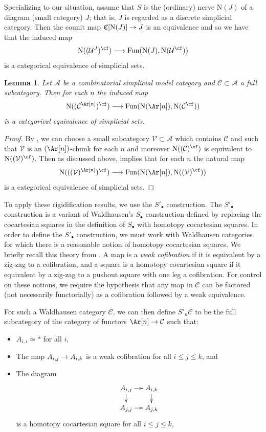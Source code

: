 \documentclass{amsart}
\newcommand{\ssdot}{\bullet}%
\newcommand{\Spdot}[1][\ssdot]{S'_{#1}}
\newcommand{\Sdot}[1][\ssdot]{S_{#1}}
\newcommand{\htp}{\simeq}
\renewcommand{\to}{\mathchoice{\longrightarrow}{\rightarrow}{\rightarrow}{\rightarrow}}
\let\catsymbfont\mathcal
\newcommand{\aA}{{\catsymbfont{A}}}
\newcommand{\aC}{{\catsymbfont{C}}}
\newcommand{\aU}{{\catsymbfont{U}}}
\newcommand{\aV}{{\catsymbfont{V}}}
\newcommand{\A}{\mathcal{A}}
\newcommand{\N}{\mathrm{N}}
\newcommand{\Fun}{\mathrm{Fun}} %
\numberwithin{equation}{section}
\newtheorem{lemma}[equation]{Lemma}
\theoremstyle{definition}
\begin{document}
Specializing to our situation, assume that $S$ is the (ordinary) nerve
$\N(J)$ of a diagram (small category) $J$; that is, $J$ is regarded as
a discrete simplicial category.  Then the counit map
$\mathfrak{C}[\N(J)] \to J$ is an equivalence and so we have that the
induced map
\[
\N((\aU^J)^{\cf}) \to \Fun(\N(J), \N(\aU^{\cf}))
\]
is a categorical equivalence of simplicial sets.

\begin{lemma}\label{lem:diagcomp}
Let $\aA$ be a combinatorial simplicial model category and $\aC
\subset \aA$ a full subcategory.  Then for each $n$ the induced map
\[
\N((\aC^{\Ar[n]})^{\cf}) \to \Fun(\N(\Ar[n]), \N(\aC^{\cf}))
\]
is a categorical equivalence of simplicial sets.
\end{lemma}

\begin{proof}
By \cite[A.3.4.15]{HTT}, we can choose a small subcategory $\aV
\subset \aA$ which contains $\aC$ and such that $\aV$ is an
$(\Ar[n])$-chunk for each $n$ and moreover $\N((\aC)^{\cf})$ is
equivalent to $\N((\aV)^{\cf})$.  Then as discussed above,
\cite[4.2.4.4]{HTT} implies that for each $n$ the natural map
\[
\N(((\aV)^{\Ar[n]})^{\cf}) \to \Fun(\N(\Ar[n]),
\N((\aV)^{\cf}))
\]
is a categorical equivalence of simplicial sets.
\end{proof}

To apply these rigidification results, we use the $\Spdot$
construction.  The $\Spdot$ construction \cite[2.7]{BM3} is a variant
of Waldhausen's $\Sdot$ construction defined by replacing the cocartesian
squares in the definition of $\Sdot$ with homotopy cocartesian
squares.  In order to define the $\Spdot$ construction, we must work
with Waldhausen categories for which there is a reasonable notion of
homotopy cocartesian squares.  We briefly recall this theory
from \cite[\S 2]{BM3}.  A map is a {\em weak cofibration} if it is
equivalent by a zig-zag to a cofibration, and a square is a homotopy
cocartesian square if it equivalent by a zig-zag to a pushout square
with one leg a cofibration.  For control on these notions, we require
the hypothesis that any map in $\aC$ can be factored (not necessarily functorially) as a
cofibration followed by a weak equivalence.

For such a Waldhausen category $\aC$, we can then define
$\Spdot[n] \aC$ to be the full subcategory of the category of functors
$\Ar[n] \to \aC$ such that:
\begin{itemize}
\item $A_{i,i} \htp *$ for all $i$, 
\item The map $A_{i,j}\to A_{i,k}$ is a weak cofibration for all $i \leq
j \leq k$, and
\item The diagram
\[  \xymatrix@-1pc{%
A_{i,j}\ar[r]\ar[d]&A_{i,k}\ar[d]\\A_{j,j}\ar[r]&A_{j,k}
} \]
is a homotopy cocartesian square for all $i \leq j \leq k$, 
\end{itemize}
\end{document}
